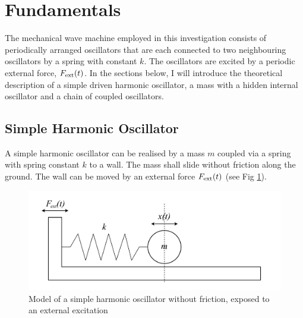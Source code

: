 \documentclass[12pt]{article}
\begin{document}
\clearpage

\section{Fundamentals}\label{Fundamentals}
The mechanical wave machine employed in this investigation consists of periodically arranged oscillators that are each connected to two neighbouring oscillators by a spring with constant $k$. The oscillators are excited by a periodic external force, $F_{\rm ext}(t)$. In the sections below, I will introduce the theoretical description of a simple driven harmonic oscillator, a mass with a hidden internal oscillator and a chain of coupled oscillators.

\subsection{Simple Harmonic Oscillator}  
A simple harmonic oscillator can be realised by a mass $m$ coupled via a spring with spring constant $k$ to a wall. The mass shall slide without friction along the ground. The wall can be moved by an external force $F_{\rm ext}(t)$ (see Fig \ref{fig:SHO}).

\begin{figure}[hbt]
  \includegraphics[width=\columnwidth]{simple_harmonic_oscillator.pdf}
  \caption{Model of a simple harmonic oscillator without friction, exposed to an external excitation}\label{fig:SHO}
\end{figure}
\end{document}
